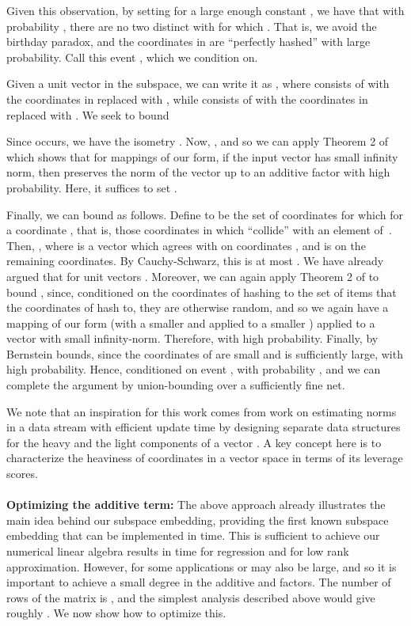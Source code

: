 \documentclass{sig-alternate}
\begin{document}
Given this observation, by setting  for a large enough constant , we have that with probability , there are no
two distinct  with  for which . That is, we avoid the birthday paradox,
and the coordinates in  are ``perfectly hashed'' with large
probability. Call this event , which we condition on. 

Given a unit vector  in the subspace, we can write it as , where  consists of  with
the coordinates in  replaced with , while  consists of  with the coordinates in  replaced with . We seek
to bound 

Since  occurs,
we have the isometry . Now, , and so we can apply Theorem 2 of 
\cite{dks10} which shows that for mappings of our form, if the input vector has small infinity norm, then  preserves the norm of the
vector up to an additive  factor with high probability. Here, it suffices to set . 

Finally, we can bound
 as follows. Define  to be the set of coordinates  for
which  for a coordinate , that is, those coordinates in  which ``collide'' with an element of~.
Then, , where  is a vector which agrees with  on coordinates
, and is  on the remaining coordinates. By Cauchy-Schwarz, this is at most .
We have already argued that  for unit vectors . Moreover, we can again apply Theorem 2 of \cite{dks10}
to bound , since, conditioned on the coordinates of  hashing to the set of items that the coordinates of  hash to, they
are otherwise random, and so we again have a mapping of our form (with a smaller  and applied to a smaller ) applied to a vector
with small infinity-norm. Therefore,  with high probability. Finally, by Bernstein bounds, since the
coordinates of  are small and  is sufficiently large,  with high probability. Hence, conditioned on event ,
 with probability , and we can complete the argument by union-bounding over a sufficiently
fine net. 

We note that an inspiration for this work comes from work on estimating norms in a data stream with efficient update time 
by designing separate data structures for the heavy and the light components of a vector \cite{nw10,knpw11}. A key concept here is to
characterize the heaviness of coordinates in a vector space in terms of its leverage scores. 
\\\\
{\bf Optimizing the additive term:}
The above approach already illustrates the main idea behind our subspace embedding, providing the first known subspace
embedding that can be implemented in  time. This is sufficient
to achieve our numerical linear algebra results in time 
for regression and  for low rank approximation. However, 
for some applications  or  may also be large, 
and so it is important to achieve a small degree 
in the additive  and  factors. 
The number of rows of the matrix  is ,
and the simplest analysis described above would give roughly 
. We now show how to optimize this.
\end{document}
